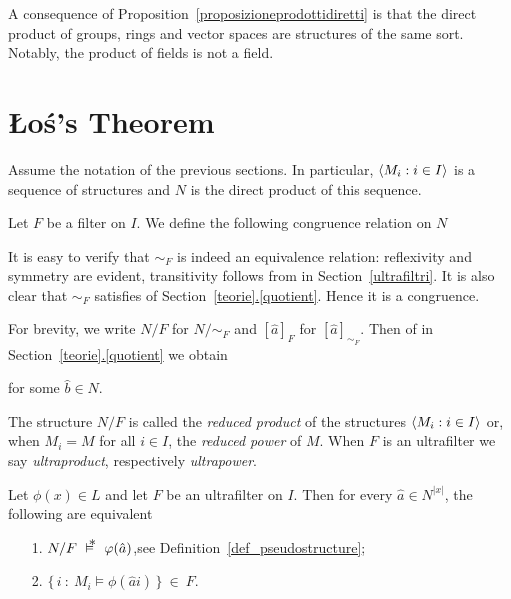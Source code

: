 \documentclass[creche.tex]{subfiles}
\begin{document}
A consequence of Proposition~\ref{proposizioneprodottidiretti} is that the direct product of groups, rings and vector spaces are structures of the same sort. Notably, the product of fields is not a field.

\section{\L o\'{s}'s Theorem}
Assume the notation of the previous sections. In particular, $\langle M_i:i\in I\rangle$ is a sequence of structures and $N$ is the direct product of this sequence. 

Let $F$ be a filter on $I$. We define the following congruence relation on $N$


It is easy to verify that $\sim_F$ is indeed an equivalence relation: reflexivity and symmetry are evident, transitivity follows from  in Section~\ref{ultrafiltri}. It is also clear that $\sim_F$ satisfies  of Section~\hyperref[quotient]{\ref*{teorie}.\ref*{quotient}}. Hence it is a congruence. 

For brevity, we write $N/F$ for $N/{\sim}_F$ and $[\hat a]_F$ for $[\hat a]_{\sim_F}$. Then  of in Section~\hyperref[quotient]{\ref*{teorie}.\ref*{quotient}} we obtain

\quad for some $\hat b\in N$.

\smallskip
The structure $N/F$ is called the \emph{reduced product\/} of the structures $\langle M_i:i\in I\rangle$ or, when $M_i=M$ for all $i\in I$, the \emph{reduced power\/} of $M$. When $F$ is an ultrafilter we say \emph{ultraproduct}, respectively \emph{ultrapower}.

\begin{void_thm}[\L o\'{s} Theorem]\label{thm_los}
Let $\phi(x)\in L$ and let $F$ be an ultrafilter on $I$. Then for every $\hat a\in N^{|x|}$, the following are equivalent
\begin{itemize}
\item[1.] $N/F\ \pmodels\ \phi(\hat a)$,\hfill see  Definition~\ref{def_pseudostructure};
\item[2.] $\big\{\,i\ :\ M_i\models \phi(\hat a i)\,\big\}\ \in\ F$.
\end{itemize}
\end{void_thm}
\end{document}
